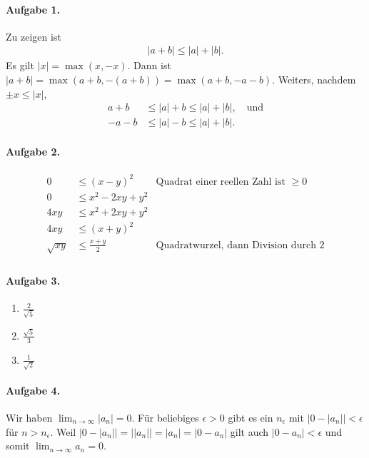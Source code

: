 \documentclass{article}
\begin{document}
\paragraph{Aufgabe 1.} Zu zeigen ist
\begin{align*}
    |a + b| \leq |a| + |b|.
\end{align*}
Es gilt $|x| = \max(x, -x)$. Dann ist $|a + b| = \max(a + b, -(a + b)) = \max(a + b, -a - b)$. Weiters, nachdem $\pm x \leq |x|$, 
\begin{align*}
    a + b &\leq |a| + b \leq |a| + |b|, \quad \text{und} \\
    -a - b &\leq |a| - b \leq |a| + |b|.
\end{align*}

\paragraph{Aufgabe 2.}
\begin{align*}
    0 &\leq (x - y)^2 &\text{Quadrat einer reellen Zahl ist $\geq 0$} \\
    0 &\leq x^2 - 2xy + y^2 \\
    4xy &\leq x^2 + 2xy + y^2 \\
    4xy &\leq (x + y)^2 \\
    \sqrt{xy} &\leq \frac{x + y}{2} &\text{Quadratwurzel, dann Division durch 2} \\
\end{align*}

\paragraph{Aufgabe 3.}

\begin{enumerate}[]
    \item $\frac{2}{\sqrt{5}}$
    \item $\frac{\sqrt{5}}{3}$
    \item $\frac{1}{\sqrt{2}}$
\end{enumerate}

\paragraph{Aufgabe 4.}

Wir haben $\lim_{n \to \infty} |a_n| = 0$. Für beliebiges $\epsilon > 0$ gibt es ein $n_\epsilon$ mit $|0 - |a_n|| < \epsilon$ für $n > n_\epsilon$. Weil $|0 - |a_n|| = ||a_n|| = |a_n| = |0 - a_n|$ gilt auch $|0 - a_n| < \epsilon$ und somit $\lim_{n \to \infty} a_n = 0$.
\end{document}
